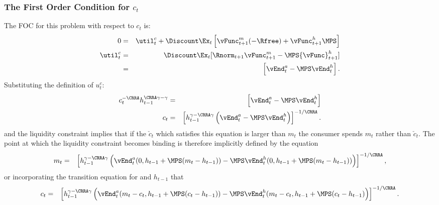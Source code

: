 \documentclass[titlepage]{\econtex}
\begin{document}
{  \subsubsection{The First Order Condition for ${c}_{t}$}
  The FOC for this problem with respect to ${c}_{t}$ is:
  \begin{eqnarray}
    0 & = & \util^{c}_{t} + \Discount \Ex_{t} \left[{\vFunc}^{m}_{t+1}(-\Rfree)+{\vFunc}^{h}_{t+1} \MPS\right]  \\
    \util^{c}_{t} & = & \Discount \Ex_{t} [\Rnorm_{t+1} {\vFunc}_{t+1}^{m}-\MPS {\vFunc}_{t+1}^{h}] \label{eq:ctfoc}
    \\           & = & \left[\vEnd_{t}^{{a}}-\MPS \vEnd_{t}^{h} \right].
  \end{eqnarray}
  Substituting the definition of $u_{t}^{c}$:
  \begin{eqnarray}
    {c}_{t}^{-\CRRA}h_{t-1}^{\CRRA\gamma-\gamma} & = & \left[\vEnd_{t}^{{a}}-\MPS \vEnd_{t}^{h} \right]
    \\  {c}_{t}                                    & = & \left[h_{t-1}^{\gamma-\CRRA\gamma} \left(\vEnd_{t}^{{a}}-\MPS \vEnd_{t}^{h} \right) \right]^{-1/\CRRA} \label{eq:habitsfoc}.
  \end{eqnarray}
  and the liquidity constraint implies that if the $\check{c}_{t}$ which
  satisfies this equation is larger than ${m}_{t}$ the consumer spends
  ${m}_{t}$ rather than $\check{c}_{t}$.  The point at which the liquidity
  constraint becomes binding is therefore implicitly defined by the equation
  \begin{eqnarray}
    {m}_{t} & = & \left[h_{t-1}^{\gamma-\CRRA\gamma} \left(\vEnd_{t}^{{a}}(0,h_{t-1}+\MPS({m}_{t}-h_{t-1}))-\MPS \vEnd_{t}^{h}(0,h_{t-1}+\MPS({m}_{t}-h_{t-1}))\right)  \right]^{-1/\CRRA}, \label{eq:LCbindsHabits}
  \end{eqnarray}
  or incorporating the transition equation for
  and $h_{t-1}$ that
  \begin{eqnarray}
    {c}_{t} & = & \left[h_{t-1}^{\gamma-\CRRA\gamma}
                  \left(\vEnd_{t}^{{a}}({m}_{t}-{c}_{t},h_{t-1}+\MPS({c}_{t}-h_{t-1}))
                  -\MPS \vEnd_{t}^{h}({m}_{t}-{c}_{t},h_{t-1}+\MPS({c}_{t}-h_{t-1})\right)
                  \right]^{-1/\CRRA}. \nonumber
  \end{eqnarray}

}
\end{document}
